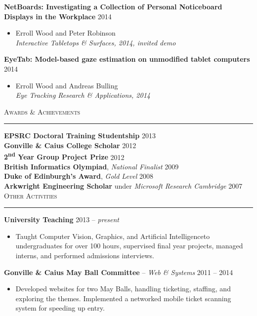 \documentclass{article}
\begin{document}
\textbf{NetBoards: Investigating a Collection of Personal Noticeboard Displays in the Workplace} \hfill 2014 \\[-6mm]
\begin{itemize}
  \item[] Erroll Wood and Peter Robinson \\
  \emph{Interactive Tabletops \& Surfaces, 2014, invited demo}
\end{itemize} \smallskip

\textbf{EyeTab: Model-based gaze estimation on unmodified tablet computers} \hfill  2014 \\[-6mm]
\begin{itemize}
  \item[] Erroll Wood and Andreas Bulling \\
  \emph{Eye Tracking Research \& Applications, 2014}
\end{itemize} \bigskip

\textsc{Awards \& Achievements} \smallskip \hrule \smallskip

\textbf{EPSRC Doctoral Training Studentship} \hfill 2013 \\[+1mm]
\textbf{Gonville \& Caius College Scholar} \hfill 2012 \\[+1mm]
\textbf{2\textsuperscript{nd} Year Group Project Prize} \hfill 2012 \\[+1mm]
\textbf{British Informatics Olympiad}, \emph{National Finalist} \hfill 2009 \\[+1mm]
\textbf{Duke of Edinburgh's Award}, \emph{Gold Level} \hfill 2008 \\[+1mm]
\textbf{Arkwright Engineering Scholar} under \emph{Microsoft Research Cambridge} \hfill 2007 \\

\textsc{Other Activities} \smallskip \hrule \smallskip

\textbf{University Teaching} \hfill 2013 -- \emph{present} \\[-6mm]
\begin{itemize}
  \item[]
  Taught Computer Vision, Graphics, and Artificial Intelligenceto undergraduates for over 100 hours, supervised final year projects, managed interns, and performed admissions interviews.
\end{itemize} \smallskip

\textbf{Gonville \& Caius May Ball Committee} -- \emph{Web \& Systems} \hfill 2011 -- 2014
\\[-6mm]
\begin{itemize}
  \item[]
  Developed websites for two May Balls, handling ticketing, staffing, and exploring the themes. Implemented a networked mobile ticket scanning system for speeding up entry.
\end{itemize} \smallskip
\end{document}
